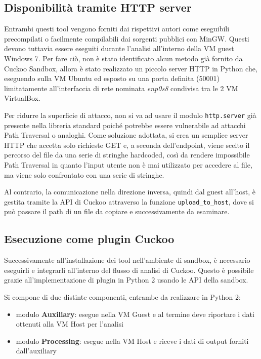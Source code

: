 \subsection{Disponibilità tramite HTTP server}
Entrambi questi tool vengono forniti dai rispettivi autori come eseguibili precompilati o facilmente compilabili dai sorgenti pubblici con MinGW.
Questi devono tuttavia essere eseguiti durante l'analisi all'interno della VM guest Windows 7. Per fare ciò, non è stato identificato alcun metodo già fornito da Cuckoo Sandbox, allora è stato realizzato un piccolo server HTTP in Python che, eseguendo sulla VM Ubuntu ed esposto su una porta definita (50001) limitatamente all'interfaccia di rete nominata \emph{enp0s8} condivisa tra le 2 VM VirtualBox.

Per ridurre la superficie di attacco, non si va ad usare il modulo \texttt{http.server} già presente nella libreria standard poiché potrebbe essere vulnerabile ad attacchi Path Traversal o analoghi.
Come soluzione adottata, si crea un semplice server HTTP che accetta solo richieste GET e, a seconda dell'endpoint, viene scelto il percorso del file da una serie di stringhe hardcoded, così da rendere impossibile Path Traversal in quanto l'input utente non è mai utilizzato per accedere al file, ma viene solo confrontato con una serie di stringhe.

Al contrario, la comunicazione nella direzione inversa, quindi dal guest all'host, è gestita tramite la API di Cuckoo attraverso la funzione \texttt{upload\_to\_host}, dove si può passare il path di un file da copiare e successivamente da esaminare.

\subsection{Esecuzione come plugin Cuckoo}
Successivamente all'installazione dei tool nell'ambiente di sandbox, è necessario eseguirli e integrarli all'interno del flusso di analisi di Cuckoo.
Questo è possibile grazie all'implementazione di plugin in Python 2 usando le API della sandbox.

Si compone di due distinte componenti, entrambe da realizzare in Python 2:
\begin{itemize}
    \item modulo \textbf{Auxiliary}: esegue nella VM Guest e al termine deve riportare i dati ottenuti alla VM Host per l'analisi
    \item modulo \textbf{Processing}: esegue nella VM Host e riceve i dati di output forniti dall'auxiliary
\end{itemize}

